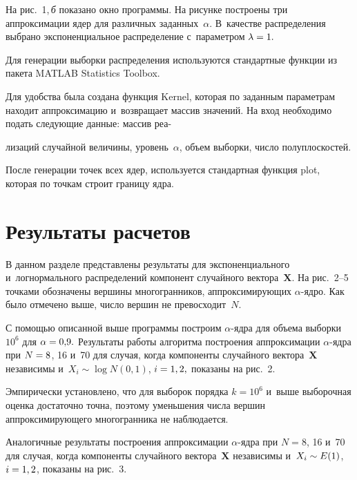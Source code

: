 \begin{multicols}{2}
На рис.~1,\,\textit{б} показано окно программы. На рисунке построены три аппроксимации 
ядер для различных заданных~$\alpha$. В~качестве распределения выбрано 
экспоненциальное рас\-пре\-де\-ле\-ние с~па\-ра\-мет\-ром $\lambda\hm=1.$


Для  генерации выборки распределения используются стандартные функции  из пакета 
MATLAB Statistics Toolbox.

Для удобства была создана функция Kernel, которая по заданным па\-ра\-мет\-рам находит  
аппроксимацию и~возвращает мас\-сив значений. На вход необходимо подать сле\-ду\-ющие 
данные: массив реа-\linebreak\vspace*{-12pt}

\pagebreak

\noindent
ли\-за\-ций случайной величины, уровень~$\alpha$, объем выборки,
 чис\-ло полуплоскостей.

После генерации точек всех ядер, используется стандартная функция plot, которая 
по точ\-кам строит границу ядра.

\vspace*{-3pt}

\section{Результаты расчетов}

\vspace*{-2pt}

В данном разделе представлены результаты для экспоненциального и~логнормального 
распределений компонент случайного вектора~$\mathbf{X}.$ На рис.~2--5 точками
 обозначены вершины многогранников, аппроксимирующих $\alpha$-яд\-ро. 
 Как было отмечено выше, чис\-ло вершин
не превосходит~$N.$


С помощью описанной выше программы построим $\alpha$-яд\-ра для объема выборки~$10^6$ 
для $\alpha\hm=0{,}9.$
Результаты работы алгоритма построения аппроксимации $\alpha$-яд\-ра при 
$N\hm=8$, 16 и~70 для случая, когда
 компоненты случайного вектора~$\mathbf{X}$ независимы и~$X_i\sim \log
 N(0,1)$, $i\hm=1,2,$
показаны на рис.~2.






Эмпирически установлено, что для выборок порядка $k=10^6$ и~выше
выборочная оценка достаточно точ\-на, поэтому уменьшения чис\-ла
вер\-шин аппроксимирующего многогранника не наблюдается.


Аналогичные результаты по\-стро\-ения аппроксимации $\alpha$-яд\-ра при $N=8$, 16 и~70 
для случая, когда
компоненты случайного вектора~$\mathbf X$ независимы и~$X_i\hm\sim E(1)$, $i\hm=1,2$,
показаны на рис.~3.


\end{multicols}
